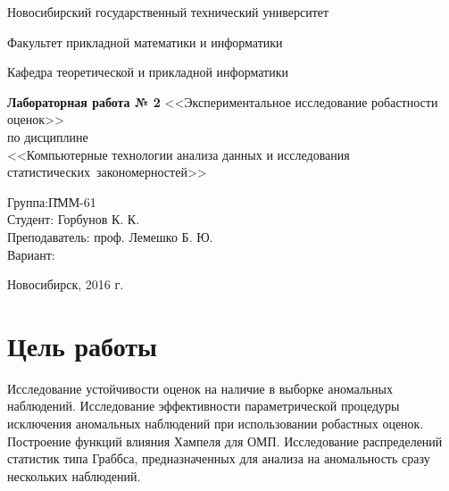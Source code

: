 \documentclass[a4paper,12pt]{article}
\begin{document}
\setcounter{secnumdepth}{0}

\begin{titlepage}

	\begin{center}
		Новосибирский государственный технический университет
		
		Факультет прикладной математики и информатики
		
		Кафедра теоретической и прикладной информатики
		
		\vspace{250pt}
		
		\textbf{\LARGE{Лабораторная работа № 2}}
		\medbreak
		\large{<<Экспериментальное исследование робастности оценок>>}\\
		\medbreak
		по дисциплине\\
		\medbreak
		<<Компьютерные технологии анализа данных и исследования 
			статистических~закономерностей>>
		\vspace{150pt}
	\end{center}

	\begin{flushleft}
		\begin{tabbing}
			Группа:\qquad\qquad	\= ПММ-61\\
			Студент:			\> Горбунов К. К.\\
			Преподаватель:		\> проф. Лемешко Б. Ю.\\
			Вариант:			 \\
		\end{tabbing}
	\end{flushleft}

	\begin{center}
		\vspace{\fill}
		Новосибирск, 2016 г.
	\end{center}

\end{titlepage}

\newpage

\section{Цель работы}

Исследование устойчивости оценок на наличие в выборке
аномальных наблюдений. Исследование эффективности параметрической
процедуры исключения аномальных наблюдений при использовании робастных
оценок. Построение функций влияния Хампеля для ОМП. Исследование
распределений статистик типа Граббса, предназначенных для анализа на
аномальность сразу нескольких наблюдений.
\end{document}
